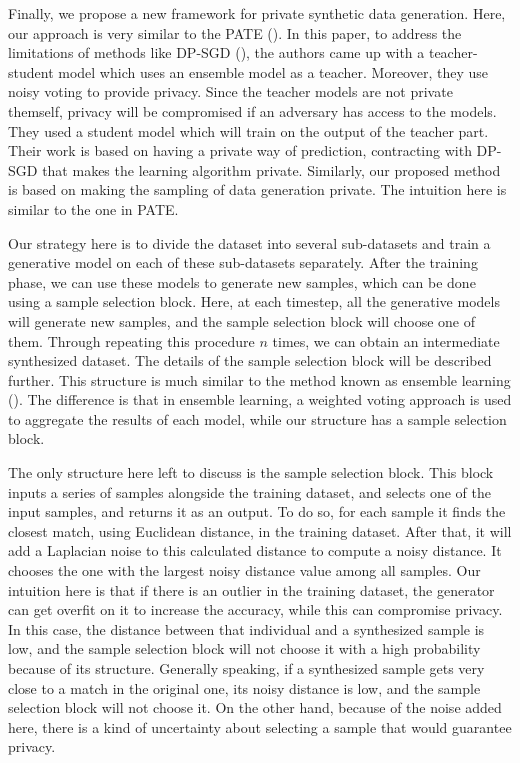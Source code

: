 \documentclass{article}
\begin{document}
Finally, we propose a new framework for private synthetic data generation. Here, our approach is very similar to the PATE (\cite{papernot2016semi}). In this paper, to address the limitations of methods like DP-SGD (\cite{abadi2016deep}), the authors came up with a teacher-student model which uses an ensemble model as a teacher. Moreover, they use noisy voting to provide privacy. Since the teacher models are not private themself, privacy will be compromised if an adversary has access to the models. They used a student model which will train on the output of the teacher part. Their work is based on having a private way of prediction, contracting with DP-SGD that makes the learning algorithm private. Similarly, our proposed method is based on making the sampling of data generation private. The intuition here is similar to the one in PATE.

Our strategy here is to divide the dataset into several sub-datasets and train a generative model on each of these sub-datasets separately. After the training phase, we can use these models to generate new samples, which can be done using a sample selection block. Here, at each timestep, all the generative models will generate new samples, and the sample selection block will choose one of them. Through repeating this procedure $n$ times, we can obtain an intermediate synthesized dataset. The details of the sample selection block will be described further. This structure is much similar to the method known as ensemble learning (\cite{dietterich2000ensemble}). The difference is that in ensemble learning, a weighted voting approach is used to aggregate the results of each model, while our structure has a sample selection block.

The only structure here left to discuss is the sample selection block. This block inputs a series of samples alongside the training dataset, and selects one of the input samples, and returns it as an output. To do so, for each sample it finds the closest match, using Euclidean distance, in the training dataset. After that, it will add a Laplacian noise to this calculated distance to compute a noisy distance. It chooses the one with the largest noisy distance value among all samples. Our intuition here is that if there is an outlier in the training dataset, the generator can get overfit on it to increase the accuracy, while this can compromise privacy. In this case, the distance between that individual and a synthesized sample is low, and the sample selection block will not choose it with a high probability because of its structure. Generally speaking, if a synthesized sample gets very close to a match in the original one, its noisy distance is low, and the sample selection block will not choose it. On the other hand, because of the noise added here, there is a kind of uncertainty about selecting a sample that would guarantee privacy.
\end{document}
